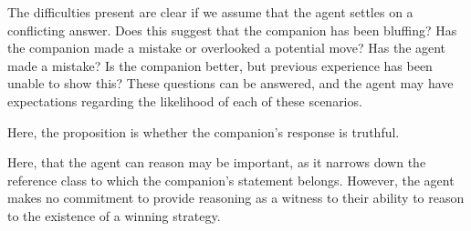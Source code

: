 \documentclass[10pt]{article}
\begin{document}
The difficulties present are clear if we assume that the agent settles on a conflicting answer.
Does this suggest that the companion has been bluffing?
Has the companion made a mistake or overlooked a potential move?
Has the agent made a mistake?
Is the companion better, but previous experience has been unable to show this?
These questions can be answered, and the agent may have expectations regarding the likelihood of each of these scenarios.

Here, the proposition is whether the companion's response is truthful.

Here, that the agent can reason may be important, as it narrows down the reference class to which the companion's statement belongs.
However, the agent makes no commitment to provide reasoning as a witness to their ability to reason to the existence of a winning strategy.
\end{document}

